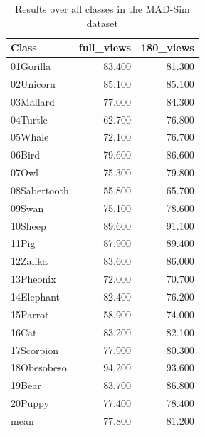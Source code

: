 \begin{table}[!htbp]
\centering
\scriptsize
\setlength{\tabcolsep}{4pt}
\renewcommand{\arraystretch}{0.95}
\begin{tabular}{l r r}
\toprule
\textbf{Class} & \textbf{full\_views} & \textbf{180\_views} \\
\midrule
01Gorilla & 83.400 & 81.300 \\
02Unicorn & 85.100 & 85.100 \\
03Mallard & 77.000 & 84.300 \\
04Turtle & 62.700 & 76.800 \\
05Whale & 72.100 & 76.700 \\
06Bird & 79.600 & 86.600 \\
07Owl & 75.300 & 79.800 \\
08Sabertooth & 55.800 & 65.700 \\
09Swan & 75.100 & 78.600 \\
10Sheep & 89.600 & 91.100 \\
11Pig & 87.900 & 89.400 \\
12Zalika & 83.600 & 86.000 \\
13Pheonix & 72.000 & 70.700 \\
14Elephant & 82.400 & 76.200 \\
15Parrot & 58.900 & 74.000 \\
16Cat & 83.200 & 82.100 \\
17Scorpion & 77.900 & 80.300 \\
18Obesobeso & 94.200 & 93.600 \\
19Bear & 83.700 & 86.800 \\
20Puppy & 77.400 & 78.400 \\
\midrule
mean & 77.800 & 81.200 \\
\bottomrule
\end{tabular}
\caption{Results over all classes in the MAD-Sim dataset}
\label{tab:results\_mad}
\end{table}